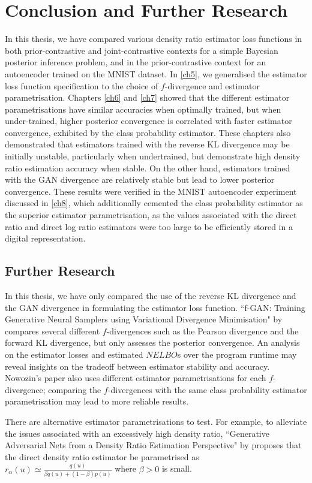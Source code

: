 \documentclass[honours,12pt]{unswthesis}
\numberwithin{equation}{section}
\theoremstyle{definition}
\begin{document}
\chapter{Conclusion and Further Research}\label{ch9}
In this thesis, we have compared various density ratio estimator loss functions in both prior-contrastive and joint-contrastive contexts for a simple Bayesian posterior inference problem, and in the prior-contrastive context for an autoencoder trained on the MNIST dataset. In \autoref{ch5}, we generalised the estimator loss function specification to the choice of $f$-divergence and estimator parametrisation. Chapters \ref{ch6} and \ref{ch7} showed that the different estimator parametrisations have similar accuracies when optimally trained, but when under-trained, higher posterior convergence is correlated with faster estimator convergence, exhibited by the class probability estimator. These chapters also demonstrated that estimators trained with the reverse KL divergence may be initially unstable, particularly when undertrained, but demonstrate high density ratio estimation accuracy when stable. On the other hand, estimators trained with the GAN divergence are relatively stable but lead to lower posterior convergence. These results were verified in the MNIST autoencoder experiment discussed in \autoref{ch8}, which additionally cemented the class probability estimator as the superior estimator parametrisation, as the values associated with the direct ratio and direct log ratio estimators were too large to be efficiently stored in a digital representation.
\section{Further Research}
In this thesis, we have only compared the use of the reverse KL divergence and the GAN divergence in formulating the estimator loss function. ``f-GAN: Training Generative Neural Samplers using Variational Divergence Minimisation" by \citet{nowozin} compares several different $f$-divergences such as the Pearson divergence and the forward KL divergence, but only assesses the posterior convergence. An analysis on the estimator losses and estimated $NELBO$s over the program runtime may reveal insights on the tradeoff between estimator stability and accuracy. Nowozin's paper also uses different estimator parametrisations for each $f$-divergence; comparing the $f$-divergences with the same class probability estimator parametrisation may lead to more reliable results.

There are alternative estimator parametrisations to test. For example, to alleviate the issues associated with an excessively high density ratio, ``Generative Adversarial Nets from a Density Ratio Estimation Perspective" by \citet{bgan} proposes that the direct density ratio estimator be parametrised as $r_\alpha(u)\simeq \frac{q(u)}{\beta q(u)+(1-\beta)p(u)}$ where $\beta>0$ is small.
\end{document}

